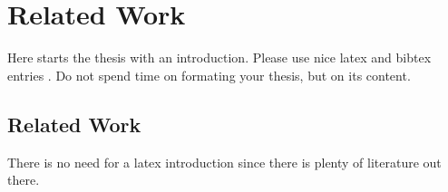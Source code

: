 \chapter{Related Work}
\label{chapter:Related Work}



Here starts the thesis with an introduction. Please use nice latex and bibtex entries \cite{latex}. Do not spend time on formating your thesis, but on its content. 
 
\section{Related Work}
There is no need for a latex introduction since there is plenty of literature out there.
 



